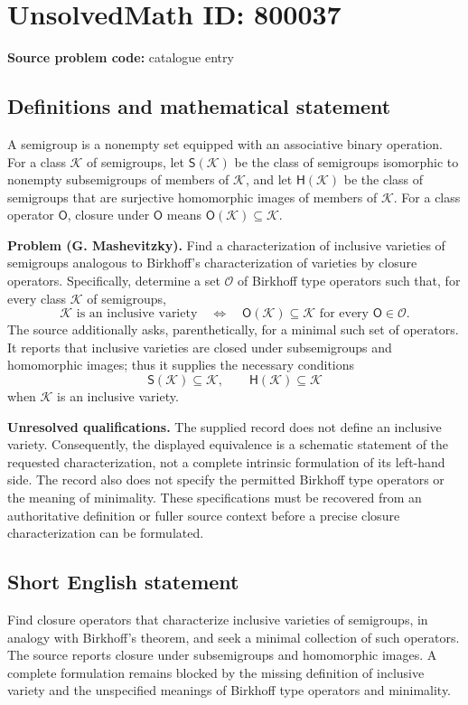 \documentclass[11pt]{article}
\begin{document}
\section*{UnsolvedMath ID: 800037}
\textbf{Source problem code:} catalogue entry
\subsection{Definitions and mathematical statement}
A semigroup is a nonempty set equipped with an associative binary operation. For a class \(\mathcal K\) of semigroups, let \(\mathsf S(\mathcal K)\) be the class of semigroups isomorphic to nonempty subsemigroups of members of \(\mathcal K\), and let \(\mathsf H(\mathcal K)\) be the class of semigroups that are surjective homomorphic images of members of \(\mathcal K\). For a class operator \(\mathsf O\), closure under \(\mathsf O\) means \(\mathsf O(\mathcal K)\subseteq\mathcal K\).

\textbf{Problem (G. Mashevitzky).} Find a characterization of inclusive varieties of semigroups analogous to Birkhoff's characterization of varieties by closure operators. Specifically, determine a set \(\mathscr O\) of Birkhoff type operators such that, for every class \(\mathcal K\) of semigroups,
\[
\mathcal K\text{ is an inclusive variety}
\quad\Longleftrightarrow\quad
\mathsf O(\mathcal K)\subseteq\mathcal K
\text{ for every }\mathsf O\in\mathscr O.
\]
The source additionally asks, parenthetically, for a minimal such set of operators. It reports that inclusive varieties are closed under subsemigroups and homomorphic images; thus it supplies the necessary conditions
\[
\mathsf S(\mathcal K)\subseteq\mathcal K,
\qquad
\mathsf H(\mathcal K)\subseteq\mathcal K
\]
when \(\mathcal K\) is an inclusive variety.

\textbf{Unresolved qualifications.} The supplied record does not define an inclusive variety. Consequently, the displayed equivalence is a schematic statement of the requested characterization, not a complete intrinsic formulation of its left-hand side. The record also does not specify the permitted Birkhoff type operators or the meaning of minimality. These specifications must be recovered from an authoritative definition or fuller source context before a precise closure characterization can be formulated.
\subsection{Short English statement}
Find closure operators that characterize inclusive varieties of semigroups, in analogy with Birkhoff's theorem, and seek a minimal collection of such operators. The source reports closure under subsemigroups and homomorphic images. A complete formulation remains blocked by the missing definition of inclusive variety and the unspecified meanings of Birkhoff type operators and minimality.
\end{document}
